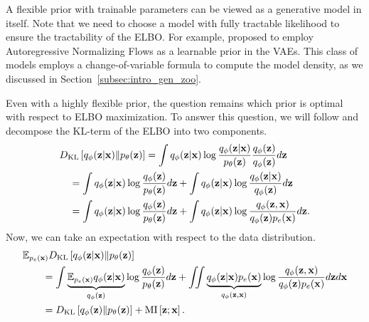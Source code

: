 A flexible prior with trainable parameters can be viewed as a generative model in itself. 
Note that we need to choose a model with fully tractable likelihood to ensure the tractability of the ELBO.
For example, \citet{chen2016variational} proposed to employ Autoregressive Normalizing Flows as a learnable prior in the VAEs. This class of models employs a change-of-variable formula to compute the model density, as we discussed in Section~\ref{subsec:intro_gen_zoo}. 

Even with a highly flexible prior, the question remains which prior is optimal with respect to ELBO maximization.
To answer this question, we will follow \citet{hoffman2016elbo} and decompose the KL-term of the ELBO into two components.
\begin{align}
&\KL{q_{\phi}(\rvz|\rvx)}{p_{\theta}(\rvz)} = \int q_{\phi}(\rvz|\rvx) \log \frac{q_{\phi}(\rvz|\rvx)}{p_{\theta}(\rvz)}\frac{q_{\phi}(\rvz)}{q_{\phi}(\rvz)}d\rvz \label{eq:elbo_prior_1}\\
 &\quad=\int q_{\phi}(\rvz|\rvx) \log \frac{q_{\phi}(\rvz)}{p_{\theta}(\rvz)}d\rvz  + \int  q_{\phi}(\rvz|\rvx) \log \frac{q_{\phi}(\rvz|\rvx)}{q_{\phi}(\rvz)}d\rvz   \label{eq:elbo_prior_2} \\
 &\quad=\int q_{\phi}(\rvz|\rvx) \log \frac{q_{\phi}(\rvz)}{p_{\theta}(\rvz)}d\rvz  + \int  q_{\phi}(\rvz|\rvx) \log \frac{q_{\phi}(\rvz, \rvx)}{q_{\phi}(\rvz) p_e(\rvx)}d\rvz.  \label{eq:elbo_prior_3}
\end{align}
\newline
Now, we can take an expectation with respect to the data distribution.
\begin{align}\label{eq:intro_kl_to_vamp}
&\E_{p_e(\rvx)} \KL{q_{\phi}(\rvz|\rvx)}{p_{\theta}(\rvz)}  \\
&\quad\quad=\int \underbrace{\E_{p_e(\rvx)} q_{\phi}(\rvz|\rvx)}_{q_{\phi}(\rvz)} \log \frac{q_{\phi}(\rvz)}{p_{\theta}(\rvz)}d\rvz  
+ \iint  \underbrace{q_{\phi}(\rvz|\rvx)p_e(\rvx)}_{q_{\phi}(\rvz, \rvx)} \log \frac{q_{\phi}(\rvz, \rvx)}{q_{\phi}(\rvz) p_e(\rvx)}d\rvz d\rvx \notag\\
&\quad\quad= \KL{q_{\phi}(\rvz)}{p_{\theta}(\rvz)}
+ \text{MI}\left[\rvz; \rvx\right].
\end{align}
